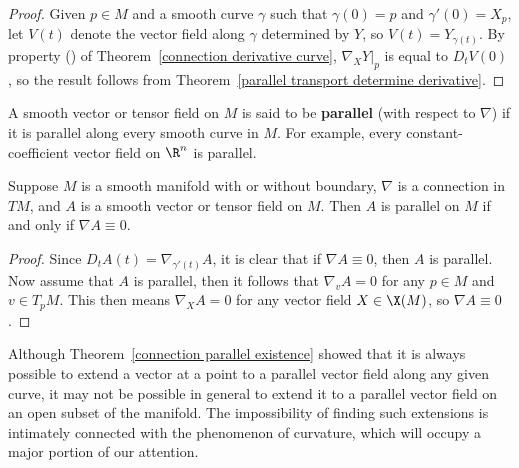 \begin{proof}
Given $p\in M$ and a smooth curve $\gamma$ such that $\gamma(0)=p$ and $\gamma'(0)=X_p$, let $V(t)$ denote the vector field along $\gamma$ determined by $Y$, so $V(t)=Y_{\gamma(t)}$. 
By property () of Theorem~\ref{connection derivative curve}, $\nabla_XY|_p$ is equal to $D_tV(0)$, so the result follows from Theorem~\ref{parallel transport determine derivative}.
\end{proof}
A smooth vector or tensor field on $M$ is said to be \textbf{parallel} (with respect to $\nabla$) if it is parallel along every smooth curve in $M$. For example, every 
constant-coefficient vector field on $\R^n$ is parallel.
\begin{proposition}\label{Riemann tensor parallel iff}
Suppose $M$ is a smooth manifold with or without boundary, $\nabla$ is a connection in $TM$, and $A$ is a smooth vector or tensor field on $M$. Then $A$ is parallel on $M$ 
if and only if $\nabla A\equiv 0$.
\end{proposition}
\begin{proof}
Since $D_tA(t)=\nabla_{\gamma'(t)}A$, it is clear that if $\nabla A\equiv 0$, then $A$ is parallel. Now assume that $A$ is parallel, then it follows that $\nabla_vA=0$ for any $p\in M$ 
and $v\in T_pM$. This then means $\nabla_XA=0$ for any vector field $X\in\X(M)$, so $\nabla A\equiv 0$.
\end{proof}
Although Theorem~\ref{connection parallel existence} showed that it is always possible to extend a vector at a point to a parallel vector field along any given curve, 
it may not be possible in general to extend it to a parallel vector field on an open subset of the manifold. The impossibility of finding such extensions is intimately connected with the phenomenon
of curvature, which will occupy a major portion of our attention.
